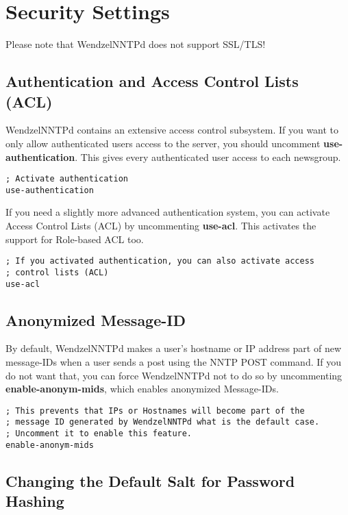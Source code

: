 \section{Security Settings}

Please note that WendzelNNTPd does not support SSL/TLS!

\subsection{Authentication and Access Control Lists (ACL)}

WendzelNNTPd contains an extensive access control subsystem. If you want to only allow authenticated users access to the server, you should uncomment \textbf{use-authentication}. This gives every authenticated user access to each newsgroup.

\begin{verbatim}
; Activate authentication
use-authentication
\end{verbatim}

If you need a slightly more advanced authentication system, you can activate Access Control Lists (ACL) by uncommenting \textbf{use-acl}. This activates the support for Role-based ACL too.

\begin{verbatim}
; If you activated authentication, you can also activate access
; control lists (ACL)
use-acl
\end{verbatim}

\subsection{Anonymized Message-ID}

By default, WendzelNNTPd makes a user's hostname or IP address part of new message-IDs when a user sends a post using the NNTP POST command. If you do not want that, you can force WendzelNNTPd not to do so by uncommenting \textbf{enable-anonym-mids}, which enables anonymized Message-IDs.

\begin{verbatim}
; This prevents that IPs or Hostnames will become part of the
; message ID generated by WendzelNNTPd what is the default case.
; Uncomment it to enable this feature.
enable-anonym-mids
\end{verbatim}

\subsection{Changing the Default Salt for Password Hashing}

